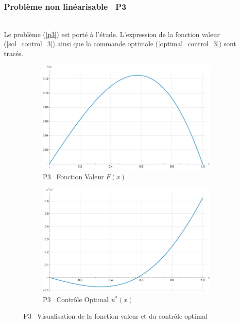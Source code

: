 \subsubsection{Problème non linéarisable \textemdash~P3}\phantom{}\\
Le problème (\ref{p3}) est porté à l'étude. L'expression de la fonction valeur (\ref{sol_control_3}) ainsi que la commande optimale (\ref{optimal_control_3}) sont tracés.
\begin{figure}[htb]
    \centering
    \begin{subfigure}{0.49\linewidth}
        \includegraphics[width=\linewidth]{img/validation/P3/p3_value.pdf}
        \caption{P3 \textemdash~Fonction Valeur $F(x)$}\label{fig:ValueVisualisation3}
    \end{subfigure}
    \hfill
    \begin{subfigure}{0.49\linewidth}
        \includegraphics[width=\linewidth]{img/validation/P3/p3_control.pdf}
        \caption{P3 \textemdash~Contrôle Optimal $u^*(x)$}\label{fig:ControlVisualisation3}
    \end{subfigure}
    \caption{P3 \textemdash~Visualisation de la fonction valeur et du contrôle optimal}\label{fig:ValueControlComparison3}
\end{figure}
